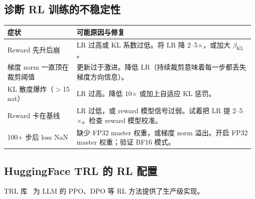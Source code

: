 \subsection{诊断 RL 训练的不稳定性}
\label{diagnosing-rl-training-instability}

\begin{examplebox}[RL 优化的红旗与修复]
{\small
\noindent\begin{tabularx}{\linewidth}{@{}l Z{1}@{}}
\toprule
\textbf{症状} & \textbf{可能原因与修复} \\
\midrule
Reward 先升后崩 & LR 过高或 KL 系数过低。将 LR 降 2--5$\times$，或加大 $\beta_\text{KL}$。 \\
梯度 norm 一直顶在裁剪阈值 & 更新过于激进。降低 LR（持续裁剪意味着每一步都丢失梯度方向信息）。 \\
KL 散度爆炸（$>$15 nat） & LR 过高。降低 10$\times$ 或加上自适应 KL 惩罚。 \\
Reward 卡在基线 & LR 过低，或 reward 模型信号过弱。试着把 LR 提 2--5$\times$。检查 reward 模型校准。 \\
100+ 步后 loss NaN & 缺少 FP32 master 权重，或梯度 norm 溢出。开启 FP32 master 权重；验证 BF16 模式。 \\
\bottomrule
\end{tabularx}
}
\end{examplebox}

\subsection{HuggingFace TRL 的 RL 配置}
\label{huggingface-trl-configuration-for-rl}

TRL 库~\cite{vonwerra2022trl} 为 LLM 的 PPO、DPO 等 RL 方法提供了生产级实现。

